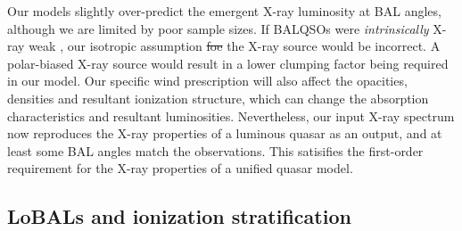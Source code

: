\documentclass[preprint, a4paper, 11pt]{aastex}
\providecommand{\DIFadd}[1]{{\protect\color{blue}\uwave{#1}}} %
\providecommand{\DIFdel}[1]{{\protect\color{red}\sout{#1}}}                      %
\providecommand{\DIFaddbegin}{} %
\providecommand{\DIFaddend}{} %
\providecommand{\DIFdelbegin}{} %
\providecommand{\DIFdelend}{} %
\begin{document}
Our models slightly over-predict the emergent X-ray luminosity at BAL angles, 
although we are limited by poor sample sizes. 
If BALQSOs were {\em intrinsically} 
X-ray weak \citep[as suggested by, e.g.][]{morabito2013},
our isotropic assumption \DIFdelbegin \DIFdel{foe }\DIFdelend \DIFaddbegin \DIFadd{for }\DIFaddend the X-ray source would be incorrect. 
A polar-biased X-ray source would result in a lower clumping factor being
required in our model. Our specific wind
prescription will also affect the opacities, densities and resultant
ionization structure, which can change the absorption characteristics and resultant
luminosities.
Nevertheless, our input X-ray spectrum
now reproduces the X-ray properties of a luminous quasar as an output,
and at least some BAL angles match the observations.
This satisifies the first-order requirement for the X-ray properties of 
a unified quasar model.




\subsection{LoBALs and ionization stratification}
\end{document}
